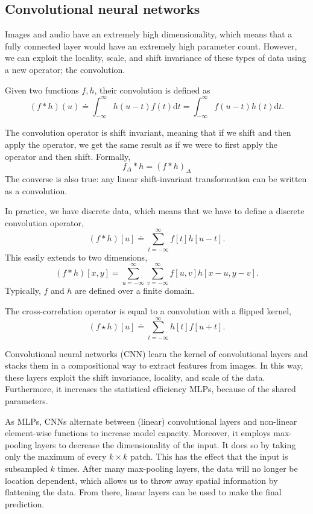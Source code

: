 \subsection{Convolutional neural networks}

Images and audio have an extremely high dimensionality, which means that a fully connected layer
would have an extremely high parameter count. However, we can exploit the locality, scale, and
shift invariance of these types of data using a new operator; the convolution.

\begin{definition}[Convolution]
    Given two functions $f,h$, their convolution is defined as \[
        (f*h)(u) \doteq \int_{-\infty}^{\infty} h(u-t)f(t) \mathrm{d}t = \int_{-\infty}^{\infty} f(u-t)h(t) \mathrm{d}t.
    \]
\end{definition}

The convolution operator is shift invariant, meaning that if we shift and then apply the operator,
we get the same result as if we were to first apply the operator and then shift. Formally, \[
    f_{\Delta} * h = (f * h)_{\Delta}
\]
The converse is also true: any linear shift-invariant transformation can be written as a
convolution.

In practice, we have discrete data, which means that we have to define a discrete convolution
operator, \[
    (f*h)[u] \doteq \sum_{t=-\infty}^{\infty} f[t] h[u-t].
\]
This easily extends to two dimensions, \[
    (f*h)[x,y] = \sum_{u=-\infty}^{\infty} \sum_{v=-\infty}^{\infty} f[u,v] h[x-u, y-v].
\]
Typically, $f$ and $h$ are defined over a finite domain.

The cross-correlation operator is equal to a convolution with a flipped kernel, \[
    (f\star h)[u] \doteq \sum_{t=-\infty}^{\infty} h[t] f[u+t].
\]

Convolutional neural networks (CNN) learn the kernel of convolutional layers and stacks them in a
compositional way to extract features from images. In this way, these layers exploit the shift
invariance, locality, and scale of the data. Furthermore, it increases the statistical efficiency
\wrt MLPs, because of the shared parameters.

As MLPs, CNNs alternate between (linear) convolutional layers and non-linear element-wise functions
to increase model capacity. Moreover, it employs max-pooling layers to decrease the dimensionality
of the input. It does so by taking only the maximum of every $k \times k$ patch. This has the
effect that the input is subsampled $k$ times. After many max-pooling layers, the data will no
longer be location dependent, which allows us to throw away spatial information by flattening the
data. From there, linear layers can be used to make the final prediction.
